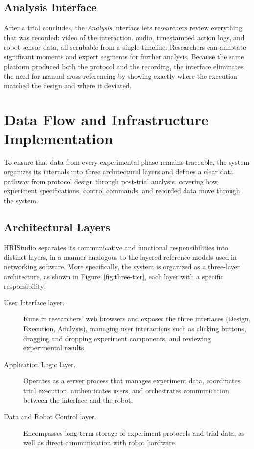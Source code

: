 \subsection{Analysis Interface}

After a trial concludes, the \emph{Analysis} interface lets researchers review everything that was recorded: video of the interaction, audio, timestamped action logs, and robot sensor data, all scrubable from a single timeline. Researchers can annotate significant moments and export segments for further analysis. Because the same platform produced both the protocol and the recording, the interface eliminates the need for manual cross-referencing by showing exactly where the execution matched the design and where it deviated.

\section{Data Flow and Infrastructure Implementation}

To ensure that data from every experimental phase remains traceable, the system organizes its internals into three architectural layers and defines a clear data pathway from protocol design through post-trial analysis, covering how experiment specifications, control commands, and recorded data move through the system.

\subsection{Architectural Layers}

HRIStudio separates its communicative and functional responsibilities into distinct layers, in a manner analogous to the layered reference models used in networking software. More specifically, the system is organized as a three-layer architecture, as shown in Figure~\ref{fig:three-tier}, each layer with a specific responsibility:

\begin{description}
\item[User Interface layer.] Runs in researchers' web browsers and exposes the three interfaces (Design, Execution, Analysis), managing user interactions such as clicking buttons, dragging and dropping experiment components, and reviewing experimental results.
\item[Application Logic layer.] Operates as a server process that manages experiment data, coordinates trial execution, authenticates users, and orchestrates communication between the interface and the robot.
\item[Data and Robot Control layer.] Encompasses long-term storage of experiment protocols and trial data, as well as direct communication with robot hardware.
\end{description}

